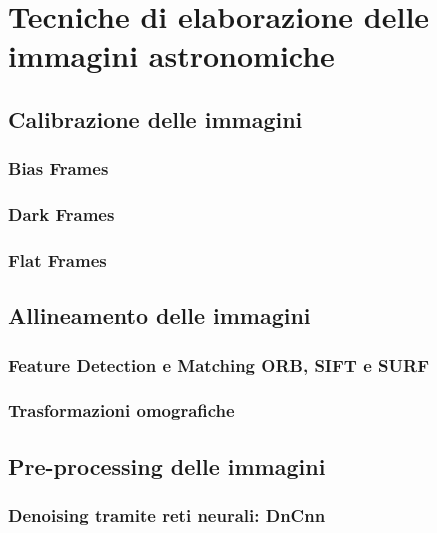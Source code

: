 \chapter{Tecniche di elaborazione delle immagini astronomiche} \label{chap:techniques}

\section{Calibrazione delle immagini} \label{sec:calibration}

\subsection{Bias Frames} \label{subsec:bias}

\subsection{Dark Frames} \label{subsec:dark}

\subsection{Flat Frames} \label{subsec:flat}

\section{Allineamento delle immagini} \label{sec:alignment}

\subsection{Feature Detection e Matching ORB, SIFT e SURF} \label{subsec:feature_detectoion}

\subsection{Trasformazioni omografiche} \label{subsec:homography}

\section{Pre-processing delle immagini} \label{sec:preprocessing}

\subsection{Denoising tramite reti neurali: DnCnn} \label{subsec:denoising}

